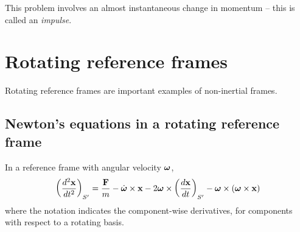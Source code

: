 \documentclass{../../template/note}
\begin{document}
    \begin{remark*}
        This problem involves an almost instantaneous change in momentum -- this is called an \emph{impulse}.
    \end{remark*}
    
    \section{Rotating reference frames}

    Rotating reference frames are important examples of non-inertial frames.

    \subsection{Newton's equations in a rotating reference frame}

    \begin{theorem}
        In a reference frame with angular velocity \(\V \omega\),
        \begin{align*}
            \left(\frac{d^2\V x}{dt^2}\right)_{S'} = \frac{\V F}m - \dot{\V \omega} \times \V x - 2 \V \omega \times \left(\frac{d\V x}{dt}\right)_{S'} - \V \omega \times (\V \omega \times \V x)
        \end{align*}
        where the notation indicates the component-wise derivatives, for components with respect to a rotating basis.
    \end{theorem}
\end{document}

